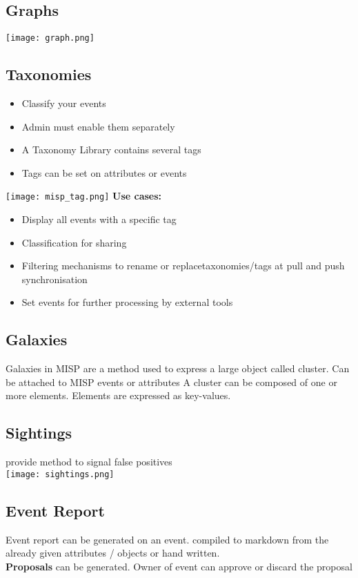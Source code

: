 \subsection{Graphs}
\texttt{[image: graph.png]}

\subsection{Taxonomies}
\begin{itemize}
    \item Classify your events
    \item Admin must enable them separately
    \item A Taxonomy Library contains several tags
    \item Tags can be set on attributes or events
\end{itemize}
\texttt{[image: misp\_tag.png]}
\textbf{Use cases:}
\begin{itemize}
    \item Display all events with a specific tag
    \item Classification for sharing
    \item Filtering mechanisms to rename or replacetaxonomies/tags at pull and push synchronisation
    \item Set events for further processing by external tools
\end{itemize}
\subsection{Galaxies}
Galaxies in MISP are a method used to express a large object called cluster.
Can be attached to MISP events or attributes
A cluster can be composed of one or more elements.
Elements are expressed as key-values.
\subsection{Sightings}
provide method to signal false positives\\
\texttt{[image: sightings.png]}
\subsection{Event Report}
Event report can be generated on an event. compiled to markdown from the already given attributes / objects or hand written.\\
\textbf{Proposals} can be generated. Owner of event can approve or discard the proposal
